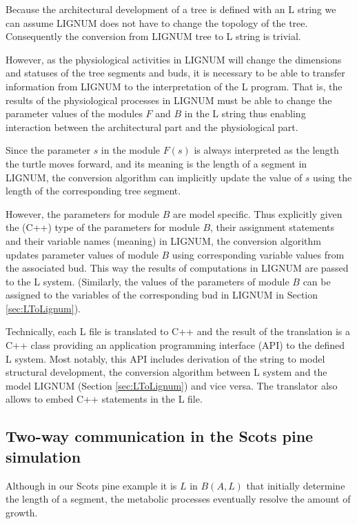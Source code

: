 Because the architectural  development of a tree is  defined with an L
string we  can assume LIGNUM does  not have to change  the topology of
the tree.  Consequently the conversion from LIGNUM tree to L string is
trivial.
  
However,    as     the    physiological    activities     in    LIGNUM
\citep{perttunen:96} will  change the  dimensions and statuses  of the
tree  segments  and buds,  it  is necessary  to  be  able to  transfer
information from LIGNUM to the  interpretation of the L program.  That
is, the results of the  physiological processes in LIGNUM must be able
to change  the parameter values  of the modules  $F$ and $B$ in  the L
string thus  enabling interaction  between the architectural  part and
the physiological part.

Since the parameter $s$ in  the module $F(s)$ is always interpreted as
the length the turtle moves forward,  and its meaning is the length of
a segment  in LIGNUM, the  conversion algorithm can  implicitly update
the value of $s$ using the length of the corresponding tree segment.

However,  the parameters  for  module $B$  are  model specific.   Thus
explicitly  given the  (C++) type  of the  parameters for  module $B$,
their  assignment statements  and  their variable  names (meaning)  in
LIGNUM, the  conversion algorithm  updates parameter values  of module
$B$ using corresponding variable values from the associated bud.  This
way the results of computations in  LIGNUM are passed to the L system.
(Similarly, the values of the parameters of module $B$ can be assigned
to  the  variables of  the  corresponding  bud  in LIGNUM  in  Section
\ref{sec:LToLignum}).

Technically, each  L file is translated  to C++ and the  result of the
translation  is  a  C++  class providing  an  application  programming
interface  (API) to  the defined  L  system.  Most  notably, this  API
includes derivation of the string to model structural development, the
conversion algorithm  between L system  and the model  LIGNUM (Section
\ref{sec:LToLignum}) and  vice versa.   The translator also  allows to
embed C++ statements in the L file.

\subsection{Two-way communication in the Scots pine simulation}

Although  in  our  Scots pine  example  it  is  $L$ in  $B(A,L)$  that
initially determine  the length of a segment,  the metabolic processes
eventually resolve the amount of growth.
  
